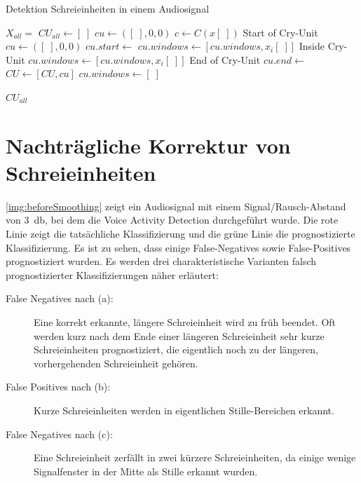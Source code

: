 \begin{algorithm}[H]
	\caption{Detektion Schreieinheiten in einem Audiosignal}
	\label{alg:cryUnit}
	\begin{algorithmic}[1]
		\State $X_{all} = $ 
		\State $ CU_{all} \gets [\;]$
		\State $ cu\gets ([\;],0,0)$
				\State $ c \gets C(x[\;])$
				\State \Comment Start of Cry-Unit
						\State $cu\gets ([\;],0,0)$
						\State $cu.start \gets $ 
						\State $cu.windows \gets [cu.windows, x_i[\;]]$
				\EndIf
				\State \Comment Inside Cry-Unit
						\State $cu.windows \gets [cu.windows, x_i[\;]]$
				\EndIf
				\State \Comment End of Cry-Unit
						\State $cu.end \gets $ 
						\State $CU \gets [CU, cu]$
						\State $cu.windows \gets [\;]$
				\EndIf
		\EndFor
		
		
		\Return $CU_{all}$
		
		\EndFunction
		
	\end{algorithmic}
\end{algorithm}


\section{Nachträgliche Korrektur von Schreieinheiten}
\label{sec:decision_smoothing_new}

\autoref{img:beforeSmoothing} zeigt ein Audiosignal mit einem Signal/Rausch-Abstand von \SI{3}{\decibel}, bei dem die Voice Activity Detection durchgeführt wurde. Die rote Linie zeigt die tatsächliche Klassifizierung und die grüne Linie die prognostizierte Klassifizierung. Es ist zu sehen, dass einige False-Negatives sowie False-Positives prognostiziert wurden. Es werden drei charakteristische Varianten falsch prognostizierter Klassifizierungen näher erläutert:

\begin{description}
	\item [False Negatives nach (a): ] Eine korrekt erkannte, längere Schreieinheit wird zu früh beendet. Oft werden kurz nach dem Ende einer längeren Schreieinheit sehr kurze Schreieinheiten prognostiziert, die eigentlich noch zu der längeren, vorhergehenden Schreieinheit gehören.
	\item [False Positives nach (b): ] Kurze Schreieinheiten werden in eigentlichen Stille-Bereichen erkannt.
	\item [False Negatives nach (c): ] Eine Schreieinheit zerfällt in zwei kürzere Schreieinheiten, da einige wenige Signalfenster in der Mitte als Stille erkannt wurden.
\end{description}

